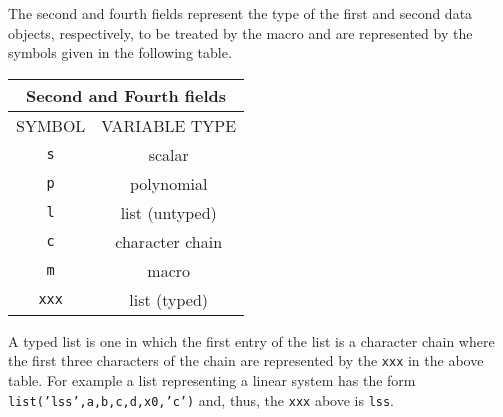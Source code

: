 The second
and fourth fields represent the type of the first and second data objects,
respectively, 
to be treated by the macro and are represented by the symbols given
in the following table.

\begin{center}
\begin{tabular}{|c|c|}
\hline  
\multicolumn{2}{|c|}{Second and Fourth fields}
\\ \hline \hline
SYMBOL & VARIABLE TYPE
\\ \hline \hline

\verb!s! & scalar  \\ \hline

\verb!p! & polynomial \\ \hline

\verb!l! & list (untyped)  \\ \hline

\verb!c! & character chain   \\ \hline

\verb!m! & macro  \\ \hline

\verb!xxx! & list (typed)  \\ \hline 
\end{tabular}
\end{center}

A typed list is one in which the first
entry of the list is a character chain where the first
three characters of the chain are represented by the 
{\tt xxx} in the above table.  For example a list
representing a linear system has the form 
{\tt list('lss',a,b,c,d,x0,'c')} and, thus, the {\tt xxx}
above is {\tt lss}.

